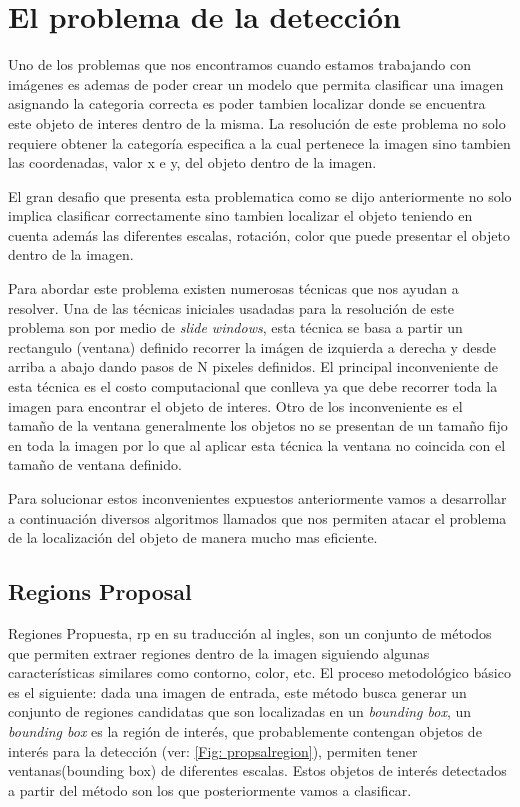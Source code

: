 \section{El problema de la detección}\label{sub:problema_deteccion}

Uno de los problemas que nos encontramos cuando estamos trabajando con imágenes es ademas de poder crear un modelo que permita clasificar una imagen asignando la categoria correcta es poder tambien localizar donde se encuentra este objeto de interes dentro de la misma. La resolución de este problema no solo requiere obtener la categoría especifica a la cual pertenece la imagen sino tambien las coordenadas, valor x e y, del objeto dentro de la imagen. 

El gran desafio que presenta esta problematica como se dijo anteriormente no solo implica clasificar correctamente sino tambien localizar el objeto teniendo en cuenta además las diferentes escalas, rotación, color que puede presentar el objeto dentro de la imagen.

Para abordar este problema existen numerosas técnicas que nos ayudan a resolver. Una de las técnicas iniciales usadadas para la resolución de este problema son por medio de  \textit{slide windows}, esta técnica se basa a partir un rectangulo (ventana) definido recorrer la imágen de izquierda a derecha y desde arriba a abajo dando pasos de N pixeles definidos. El principal inconveniente de esta técnica es el costo computacional que conlleva ya que debe recorrer toda la imagen para encontrar el objeto de interes. Otro de los inconveniente es el tamaño de la ventana generalmente los objetos no se presentan de un tamaño fijo en toda la imagen por lo que al aplicar esta técnica la ventana no coincida con el tamaño de ventana definido. 

Para solucionar estos inconvenientes expuestos anteriormente vamos a desarrollar a continuación diversos algoritmos llamados  que nos permiten atacar el problema de la localización del objeto de manera mucho mas eficiente.


\subsection{Regions Proposal} \label{sub:regions-proposal}

Regiones Propuesta, \ac{rp} en su traducción al ingles, son un conjunto de métodos que permiten extraer regiones dentro de la imagen siguiendo algunas características similares como contorno, color, etc. El proceso metodológico básico es el siguiente: dada una imagen de entrada, este método busca generar un conjunto de regiones candidatas que son localizadas en un \textit{bounding box}, un \textit{bounding box} es la región de interés, que probablemente contengan objetos de interés para la detección (ver: \ref{Fig: propsalregion}), permiten tener ventanas(bounding box) de diferentes escalas. Estos objetos de interés detectados a partir del método son los que posteriormente vamos a clasificar.

